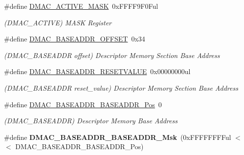 \begin{DoxyCompactItemize}
\item 
\hypertarget{group___s_a_m_l21___d_m_a_c_ga7a4f22b2de6c00f878ac18c9240525e3}{}\#define \hyperlink{group___s_a_m_l21___d_m_a_c_ga7a4f22b2de6c00f878ac18c9240525e3}{D\+M\+A\+C\+\_\+\+A\+C\+T\+I\+V\+E\+\_\+\+M\+A\+S\+K}~0x\+F\+F\+F\+F9\+F0\+Ful\label{group___s_a_m_l21___d_m_a_c_ga7a4f22b2de6c00f878ac18c9240525e3}

\begin{DoxyCompactList}\small\item\em (D\+M\+A\+C\+\_\+\+A\+C\+T\+I\+V\+E) M\+A\+S\+K Register \end{DoxyCompactList}\item 
\hypertarget{group___s_a_m_l21___d_m_a_c_ga2b0800a455e31dbff5d2427c8838f016}{}\#define \hyperlink{group___s_a_m_l21___d_m_a_c_ga2b0800a455e31dbff5d2427c8838f016}{D\+M\+A\+C\+\_\+\+B\+A\+S\+E\+A\+D\+D\+R\+\_\+\+O\+F\+F\+S\+E\+T}~0x34\label{group___s_a_m_l21___d_m_a_c_ga2b0800a455e31dbff5d2427c8838f016}

\begin{DoxyCompactList}\small\item\em (D\+M\+A\+C\+\_\+\+B\+A\+S\+E\+A\+D\+D\+R offset) Descriptor Memory Section Base Address \end{DoxyCompactList}\item 
\hypertarget{group___s_a_m_l21___d_m_a_c_gaa7adfed5ff6555d1383e197e38eb3391}{}\#define \hyperlink{group___s_a_m_l21___d_m_a_c_gaa7adfed5ff6555d1383e197e38eb3391}{D\+M\+A\+C\+\_\+\+B\+A\+S\+E\+A\+D\+D\+R\+\_\+\+R\+E\+S\+E\+T\+V\+A\+L\+U\+E}~0x00000000ul\label{group___s_a_m_l21___d_m_a_c_gaa7adfed5ff6555d1383e197e38eb3391}

\begin{DoxyCompactList}\small\item\em (D\+M\+A\+C\+\_\+\+B\+A\+S\+E\+A\+D\+D\+R reset\+\_\+value) Descriptor Memory Section Base Address \end{DoxyCompactList}\item 
\hypertarget{group___s_a_m_l21___d_m_a_c_ga0374f88f6164b4a8f3a1cb907ca86245}{}\#define \hyperlink{group___s_a_m_l21___d_m_a_c_ga0374f88f6164b4a8f3a1cb907ca86245}{D\+M\+A\+C\+\_\+\+B\+A\+S\+E\+A\+D\+D\+R\+\_\+\+B\+A\+S\+E\+A\+D\+D\+R\+\_\+\+Pos}~0\label{group___s_a_m_l21___d_m_a_c_ga0374f88f6164b4a8f3a1cb907ca86245}

\begin{DoxyCompactList}\small\item\em (D\+M\+A\+C\+\_\+\+B\+A\+S\+E\+A\+D\+D\+R) Descriptor Memory Base Address \end{DoxyCompactList}\item 
\hypertarget{group___s_a_m_l21___d_m_a_c_ga7fa84a91595b134bdcdd2c49a4103015}{}\#define {\bfseries D\+M\+A\+C\+\_\+\+B\+A\+S\+E\+A\+D\+D\+R\+\_\+\+B\+A\+S\+E\+A\+D\+D\+R\+\_\+\+Msk}~(0x\+F\+F\+F\+F\+F\+F\+F\+Ful $<$$<$ D\+M\+A\+C\+\_\+\+B\+A\+S\+E\+A\+D\+D\+R\+\_\+\+B\+A\+S\+E\+A\+D\+D\+R\+\_\+\+Pos)\label{group___s_a_m_l21___d_m_a_c_ga7fa84a91595b134bdcdd2c49a4103015}


\end{DoxyCompactItemize}
